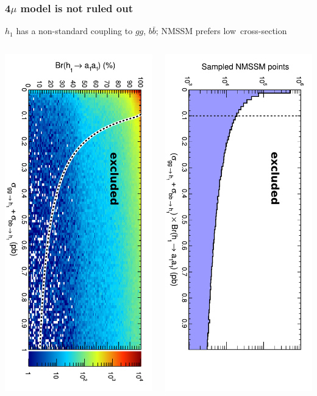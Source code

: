 \documentclass[compress]{beamer}
\begin{document}
\begin{frame}
\frametitle{4$\mu$ model is not ruled out}

\vfill
$h_1$ has a non-standard coupling to $gg$, $b\bar{b}$; NMSSM prefers \mbox{low cross-section\hspace{-1 cm}}

\vfill
\begin{columns}
\includegraphics[height=\linewidth, angle=90]{br_vs_production2.pdf}

\includegraphics[height=\linewidth, angle=90]{br_vs_production4.pdf}


\end{columns}
\end{frame}
\end{document}

